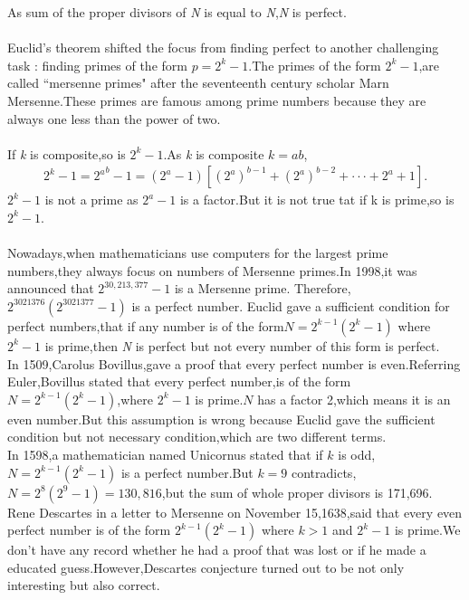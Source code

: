 \documentclass[a4paper,reqno,11pt]{book}
\theoremstyle{plain}%
\theoremstyle{definition}
\begin{document}
As sum of the proper divisors of \textit{N} is equal to \textit{N},\textit{N} is perfect.\\
\\
Euclid's theorem shifted the focus from finding perfect to another challenging task : finding primes of the form $p=2^k-1$.The primes of the form $2^k-1$,are called ``mersenne primes" after the seventeenth century scholar Marn Mersenne.These primes are famous among prime numbers because they are always one less than the power of two.\\
\\
If \textit{k} is composite,so is $2^k-1$.As \textit{k} is composite $k=ab$,
\begin{eqnarray*}
    2^k-1={2^a}^b-1
         =(2^a-1)[(2^a)^{b-1}+(2^a)^{b-2}+\cdot\cdot\cdot+2^a+1].
\end{eqnarray*}
$2^k-1$ is not a prime as $2^a-1$ is a factor.But it is not true tat if k is prime,so is $2^k-1$.\\
\\
Nowadays,when mathematicians use computers for the largest prime numbers,they always focus on numbers of Mersenne primes.In 1998,it was announced that $2^{30,213,377}-1$ is a Mersenne prime.
Therefore,$2^{3021376}(2^{3021377}-1)$ is a perfect number.
Euclid gave a sufficient condition for perfect numbers,that if any number is of the form$N=2^{k-1}(2^k-1)$ where $2^k-1$ is prime,then \textit{N} is perfect but not every number of this form is perfect.\\
\indent In 1509,Carolus Bovillus,gave a proof that every perfect number is even.Referring Euler,Bovillus stated that every perfect number,is of the form $N=2^{k-1}(2^k-1)$,where $2^k-1$ is prime.$N$ has a factor 2,which means it is an even number.But this assumption is wrong because Euclid gave the sufficient condition but not necessary condition,which are two different terms.\\
\indent In 1598,a mathematician named Unicornus stated that if $k$ is odd,$N=2^{k-1}(2^k-1)$ is a perfect number.But $k=9$ contradicts,$N=2^8(2^9-1)=130,816$,but the sum of whole proper divisors is 171,696.\\
\indent Rene Descartes in a letter to Mersenne on November 15,1638,said that every even perfect number is of the form $2^{k-1}(2^k-1)$ where $k>1$ and $2^k-1$ is prime.We don't have any record whether he had a proof that was lost or if he made a educated guess.However,Descartes conjecture turned out to be not only interesting but also correct.\\
\\
\end{document}
